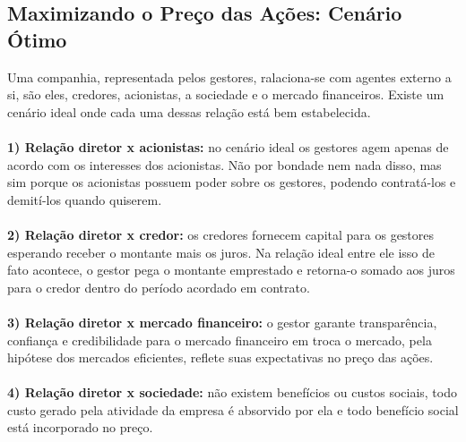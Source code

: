 \subsection*{Maximizando o Preço das Ações: Cenário Ótimo}
Uma companhia, representada pelos gestores, ralaciona-se com agentes externo a si, são eles, credores, acionistas, a sociedade e o mercado financeiros. Existe um cenário ideal onde cada uma dessas relação está bem estabelecida.
\\~\\
\textbf{1) Relação diretor x acionistas:} no cenário ideal os gestores agem apenas de acordo com os interesses dos acionistas. Não por bondade nem nada disso, mas sim porque os acionistas possuem poder sobre os gestores, podendo contratá-los e demití-los quando quiserem.
\\~\\
\textbf{2) Relação diretor x credor:} os credores fornecem capital para os gestores esperando receber o montante mais os juros. Na relação ideal entre ele isso de fato acontece, o gestor pega o montante emprestado e retorna-o somado aos juros para o credor dentro do período acordado em contrato.
\\~\\
\textbf{3) Relação diretor x mercado financeiro:} o gestor garante transparência, confiança e credibilidade para o mercado financeiro em troca o mercado, pela hipótese dos mercados eficientes, reflete suas expectativas no preço das ações.
\\~\\
\textbf{4) Relação diretor x sociedade:} não existem benefícios ou custos sociais, todo custo gerado pela atividade da empresa é absorvido por ela e todo benefício social está incorporado no preço.

